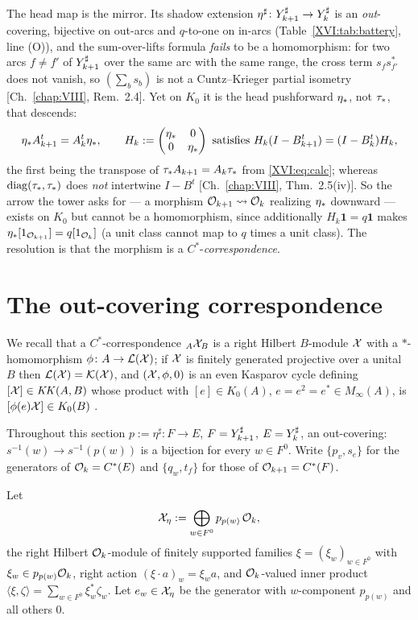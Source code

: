 The head map is the mirror. Its shadow extension $\eta^{\sharp}\colon Y_{k+1}^{\sharp}\to Y_{k}^{\sharp}$
is an \emph{out}-covering, bijective on out-arcs and $q$-to-one on in-arcs
(Table~\ref{XVI:tab:battery}, line (O)), and the sum-over-lifts formula \emph{fails} to be a
homomorphism: for two arcs $f\ne f'$ of $Y_{k+1}^{\sharp}$ over the same arc with the same range,
the cross term $s_fs_{f'}^{*}$ does not vanish, so $(\sum_bs_b)$ is not a Cuntz--Krieger
partial isometry [Ch.~\ref{chap:VIII}, Rem.~2.4]. Yet on $K_0$ it is the head pushforward $\eta_*$, not
$\tau_*$, that descends:
\begin{equation}\label{XVI:eq:etdesc}
\eta_* A_{k+1}^{t}=A_k^{t}\eta_*,\qquad
H_k:=\begin{pmatrix}\eta_*&0\\0&\eta_*\end{pmatrix}\ \text{satisfies}\
H_k(I-B_{k+1}^{t})=(I-B_k^{t})H_k ,
\end{equation}
the first being the transpose of $\tau_* A_{k+1}=A_k\tau_*$ from \eqref{XVI:eq:calc};
whereas $\operatorname{diag}(\tau_*,\tau_*)$ does \emph{not} intertwine $I-B^{t}$
[Ch.~\ref{chap:VIII}, Thm.~2.5(iv)]. So the arrow the tower asks for --- a morphism
$\mathcal{O}_{k+1}\rightsquigarrow\mathcal{O}_k$ realizing $\eta_*$ downward --- exists on $K_0$ but cannot be
a homomorphism, since additionally $H_k\mathbf1=q\mathbf1$ makes $\eta_*[1_{\mathcal{O}_{k+1}}]=q[1_{\mathcal{O}_k}]$
(a unit class cannot map to $q$ times a unit class). The resolution is that the morphism is
a $C^*$-\emph{correspondence}.

\section{The out-covering correspondence}\label{XVI:sec:corr}

We recall that a $C^*$-correspondence ${}_A\mathcal{X}_B$ is a right Hilbert $B$-module $\mathcal{X}$ with a
$*$-homomorphism $\phi\colon A\to\mathcal{L}(\mathcal{X})$; if $\mathcal{X}$ is finitely generated projective over a
unital $B$ then $\mathcal{L}(\mathcal{X})=\mathcal{K}(\mathcal{X})$, and $(\mathcal{X},\phi,0)$ is an even Kasparov cycle defining
$[\mathcal{X}]\in\mathit{KK}(A,B)$ whose product with $[e]\in K_0(A)$, $e=e^2=e^*\in M_\infty(A)$, is
$[\phi(e)\mathcal{X}]\in K_0(B)$ \cite{Kas,Bla}.

Throughout this section $p:=\eta^{\sharp}\colon F\to E$, $F=Y_{k+1}^{\sharp}$, $E=Y_{k}^{\sharp}$, an
out-covering: $s^{-1}(w)\to s^{-1}(p(w))$ is a bijection for every $w\in F^0$. Write
$\{p_v,s_e\}$ for the generators of $\mathcal{O}_k=C^*(E)$ and $\{q_w,t_f\}$ for those of
$\mathcal{O}_{k+1}=C^*(F)$.

\begin{definition}\label{XVI:def:module}
Let
\[
\mathcal{X}_\eta:=\bigoplus_{w\in F^0}p_{p(w)}\,\mathcal{O}_k ,
\]
the right Hilbert $\mathcal{O}_k$-module of finitely supported families $\xi=(\xi_w)_{w\in F^0}$
with $\xi_w\in p_{p(w)}\mathcal{O}_k$, right action $(\xi\cdot a)_w=\xi_wa$, and $\mathcal{O}_k$-valued inner
product $\langle\xi,\zeta\rangle=\sum_{w\in F^0}\xi_w^{*}\zeta_w$. Let $e_w\in\mathcal{X}_\eta$ be
the generator with $w$-component $p_{p(w)}$ and all others $0$.
\end{definition}

